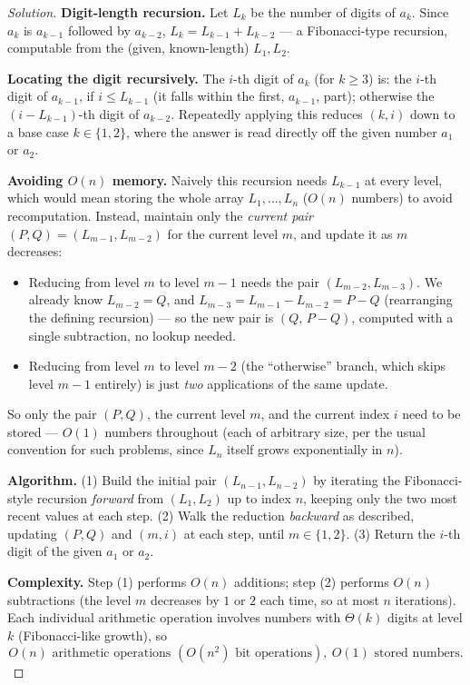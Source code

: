 \documentclass[11pt]{article}
\theoremstyle{definition}
\begin{document}
\begin{proof}[Solution]
\textbf{Digit-length recursion.} Let $L_k$ be the number of digits of $a_k$. Since $a_k$ is $a_{k-1}$ followed by $a_{k-2}$, $L_k=L_{k-1}+L_{k-2}$ — a Fibonacci-type recursion, computable from the (given, known-length) $L_1,L_2$.

\textbf{Locating the digit recursively.} The $i$-th digit of $a_k$ (for $k\ge3$) is: the $i$-th digit of $a_{k-1}$, if $i\le L_{k-1}$ (it falls within the first, $a_{k-1}$, part); otherwise the $(i-L_{k-1})$-th digit of $a_{k-2}$. Repeatedly applying this reduces $(k,i)$ down to a base case $k\in\{1,2\}$, where the answer is read directly off the given number $a_1$ or $a_2$.

\textbf{Avoiding $O(n)$ memory.} Naively this recursion needs $L_{k-1}$ at every level, which would mean storing the whole array $L_1,\dots,L_n$ ($O(n)$ numbers) to avoid recomputation. Instead, maintain only the \emph{current pair} $(P,Q)=(L_{m-1},L_{m-2})$ for the current level $m$, and update it as $m$ decreases:
\begin{itemize}
\item Reducing from level $m$ to level $m-1$ needs the pair $(L_{m-2},L_{m-3})$. We already know $L_{m-2}=Q$, and $L_{m-3}=L_{m-1}-L_{m-2}=P-Q$ (rearranging the defining recursion) — so the new pair is $(Q,\,P-Q)$, computed with a single subtraction, no lookup needed.
\item Reducing from level $m$ to level $m-2$ (the ``otherwise'' branch, which skips level $m-1$ entirely) is just \emph{two} applications of the same update.
\end{itemize}
So only the pair $(P,Q)$, the current level $m$, and the current index $i$ need to be stored — $O(1)$ numbers throughout (each of arbitrary size, per the usual convention for such problems, since $L_n$ itself grows exponentially in $n$).

\textbf{Algorithm.} (1) Build the initial pair $(L_{n-1},L_{n-2})$ by iterating the Fibonacci-style recursion \emph{forward} from $(L_1,L_2)$ up to index $n$, keeping only the two most recent values at each step. (2) Walk the reduction \emph{backward} as described, updating $(P,Q)$ and $(m,i)$ at each step, until $m\in\{1,2\}$. (3) Return the $i$-th digit of the given $a_1$ or $a_2$.

\textbf{Complexity.} Step (1) performs $O(n)$ additions; step (2) performs $O(n)$ subtractions (the level $m$ decreases by $1$ or $2$ each time, so at most $n$ iterations). Each individual arithmetic operation involves numbers with $\Theta(k)$ digits at level $k$ (Fibonacci-like growth), so
\[
\boxed{O(n)\text{ arithmetic operations }(O(n^2)\text{ bit operations}),\ O(1)\text{ stored numbers}}.
\]
\end{proof}
\end{document}
